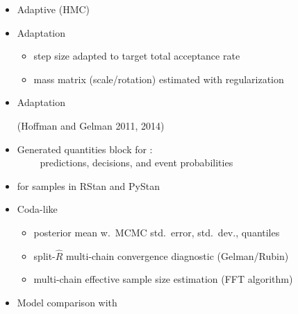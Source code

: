 \documentclass[10pt]{report}
\begin{document}
%
\begin{itemize}
\item Adaptive  (HMC)
\item Adaptation 
  \vspace*{-4pt}
  \begin{itemize}\small
  \item step size adapted to target total acceptance rate
  \item mass matrix (scale/rotation) estimated with regularization
  \end{itemize}
\item Adaptation 
\vfill
\hfill 
{\footnotesize (Hoffman and Gelman 2011, 2014)}
\end{itemize}


%
\begin{itemize}
\item Generated quantities block for :
  \\ {\small \mbox{ } \ \ \ predictions, decisions, and event probabilities}
\item {} for samples in RStan and PyStan
\item Coda-like 
  \vspace*{-4pt}
  \begin{itemize}\small
  \item posterior mean w.\ MCMC std.\ error, std.\ dev., quantiles
  \item split-$\hat{R}$ multi-chain convergence diagnostic (Gelman/Rubin)
  \item multi-chain effective sample size estimation (FFT algorithm)
  \end{itemize}
\item Model comparison with 
\end{itemize}
\end{document}

